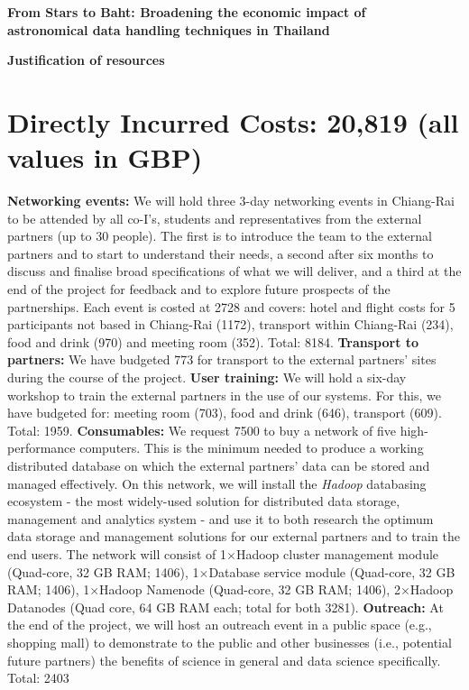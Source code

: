 \documentclass[11pt]{article}
\begin{document}
  \setcounter{figure}{0}
  \noindent
  {\LARGE \bf From Stars to Baht: Broadening the economic impact of \\
  astronomical data handling techniques in Thailand}
  
  \vspace{3mm}
  \noindent
  {\LARGE \bf Justification of resources }
  \vspace{-3mm}
  \section{Directly Incurred Costs: 20,819 (all values in GBP)}
  \vspace{-3mm}
  {\bf Networking events:} We will hold three 3-day networking events in Chiang-Rai to be attended by all co-I's, students and representatives from the external partners (up to 30 people). The first is to introduce the team to the external partners and to start to understand their needs, a second after six months to discuss and finalise broad specifications of what we will deliver, and a third at the end of the project for feedback and to explore future prospects of the partnerships. Each event is costed at 2728 and covers: hotel and flight costs for 5 participants not based in Chiang-Rai (1172), transport within Chiang-Rai (234), food and drink (970) and meeting room (352). Total: 8184. {\bf Transport to partners:} We have budgeted 773 for transport to the external partners' sites during the course of the project. {\bf User training:} We will hold a six-day workshop to train the external partners in the use of our systems. For this, we have budgeted for: meeting room (703), food and drink (646), transport (609). Total: 1959. {\bf Consumables:} We request 7500 to buy a network of five high-performance computers. This is the minimum needed to produce a working distributed database on which the external partners' data can be stored and managed effectively. On this network, we will install the {\it Hadoop} databasing ecosystem - the most widely-used solution for distributed data storage, management and analytics system - and use it to both research the optimum data storage and management solutions for our external partners and to train the end users. The network will consist of 1$\times$Hadoop cluster management module (Quad-core, 32 GB RAM; 1406), 1$\times$Database service module (Quad-core, 32 GB RAM; 1406), 1$\times$Hadoop Namenode (Quad-core, 32 GB RAM; 1406), 2$\times$Hadoop Datanodes (Quad core, 64 GB RAM each; total for both 3281). {\bf Outreach:} At the end of the project, we will host an outreach event in a public space (e.g., shopping mall) to demonstrate to the public and other businesses (i.e., potential future partners) the benefits of science in general and data science specifically. Total: 2403
  
\end{document}
